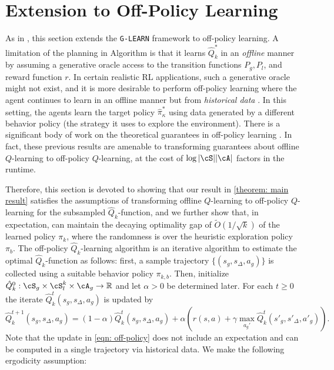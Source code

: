 \documentclass{article}
\theoremstyle{plain}
\theoremstyle{definition}
\begin{document}
\section{Extension to Off-Policy Learning}
\label{Appendix/off-policy}

  
As in \citet{anand2025meanfield}, this section extends the \texttt{G-LEARN} framework to off-policy learning. A limitation of the planning in Algorithm  is that it learns $\hat{Q}_k^*$ in an \emph{offline} manner by assuming a generative oracle access to the transition functions ${P}_g, {P}_l$, and reward function $r$. In certain realistic RL applications, such a generative oracle might not exist, and it is more desirable to perform off-policy learning where the agent continues to learn in an offline manner but from \emph{historical data} \cite{fujimoto2019off}. In this setting, the agents learn the target policy $\hat{\pi}_\kappa^*$ using data generated by a different behavior policy (the strategy it uses to explore the environment). There is a significant body of work on the theoretical guarantees in off-policy learning \cite{chen2021lyapunov,pmlr-v151-chen22i,chen2021finite,chen2025concentration,anand_et_al:LIPIcs.ICALP.2024.10}. In fact, these previous results are amenable to transforming guarantees about offline $Q$-learning to off-policy $Q$-learning, at the cost of $\log |\cS| |\cA|$ factors in the runtime. 
 
 Therefore, this section is devoted to showing that our result in \cref{theorem: main result} satisfies the assumptions of transforming offline $Q$-learning to off-policy $Q$-learning for the subsampled $\hat{Q}_k$-function, and we further show that, in expectation, can maintain the decaying optimality gap of $\tilde{O}(1/\sqrt{k})$ of the learned policy $\pi_{k}$, where the randomness is over the heuristic exploration policy $\pi_b$.  The off-policy $\hat{Q}_k$-learning algorithm is an iterative algorithm to estimate the optimal $\hat{Q}_k$-function as follows: first, a sample trajectory $\{(s_g, s_\Delta, a_g)\}$ is collected using a suitable behavior policy $\pi_{k,b}$. Then, initialize $\hat{Q}_k^{0}: \cS_g\times\cS_l^k \times  \cA_g \to\mathbb{R}$ and let $\alpha>0$ be determined later. For each $t\geq 0$  the iterate $\hat{Q}_k^{t}(s_g, s_\Delta, a_g)$ is updated by
\begin{equation}\label{eqn: off-policy}\hat{Q}_k^{t+1}(s_g, s_\Delta, a_g) = (1-\alpha) \hat{Q}_k^{t}(s_g, s_\Delta, a_g) + \alpha  \left(r(s, a) + \gamma \max_{a_g'} \hat{Q}_k^{t} (s'_g, s'_\Delta, a'_g) \right).\end{equation}
Note that the update in \cref{eqn: off-policy} does not include an expectation and can be computed in a single trajectory via historical data. We make the following ergodicity assumption:
\end{document}
